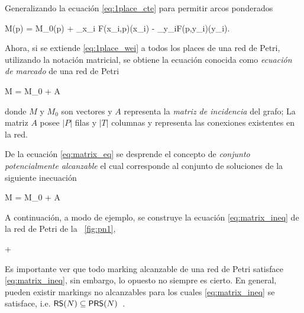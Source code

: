 Generalizando la  ecuación \eqref{eq:1place_cte} para permitir arcos ponderados

    M(p) = M_0(p) + \sum_{x_i \in {}}F(x_i,p)\cdot \widehat\sigma(x_i) - \sum_{y_i\in{}}F(p,y_i)\cdot\widehat\sigma(y_i).
\eequation

Ahora, si se extiende \eqref{eq:1place_wei} a todos los places de una red de Petri,
utilizando la notación matricial, se obtiene la ecuación conocida como 
\emph{ecuación de marcado} de una red de Petri~\cite{Murata89}

    M = M_0 + A \cdot \widehat\sigma 
\eequation

donde $M$ y $M_0$ son vectores y $A$ representa la \emph{matriz de incidencia}
del grafo; La matriz $A$ posee $|P|$ filas y $|T|$ columnas y representa las conexiones 
existentes en la red.

De la ecuación \autoref{eq:matrix_eq} se desprende el concepto
de \textit{conjunto potencialmente alcanzable} el cual corresponde al conjunto
de soluciones de la siguiente inecuación

    M = M_0 + A \cdot \widehat\sigma {}
\eequation


A continuación, a modo de ejemplo, se construye la ecuación \eqref{eq:matrix_ineq} de
la red de Petri de la ~\autoref{fig:pn1}, 

\bequation
    \left[\begin{array}{c} 1 \\ 6 \end{array} \right] +
    \left[\begin{array}{rr} 1 & -1 \\ -2 & 3 \end{array} \right]
    \cdot
    \geq 
    \left[\begin{array}{c} 0 \\ 0 \end{array} \right]
\eequation

Es importante ver que todo marking alcanzable de una red de Petri
satisface \eqref{eq:matrix_ineq}, sin embargo, lo opuesto no siempre es cierto.
En general, pueden existir markings no alcanzables para
los cuales \eqref{eq:matrix_ineq} se satisface, i.e. $\textsf{RS}(N) \subseteq \textsf{PRS}(N)$~\cite{SilvaTC96}.

